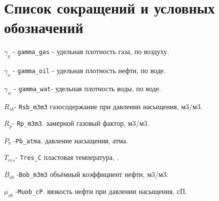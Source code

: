 \chapter*{Список сокращений и условных обозначений} %
\noindent

$\gamma_g$  - \texttt{gamma_gas} - удельная плотность газа, по воздуху. 

 $\gamma_o$  - \texttt{gamma_oil} - удельная плотность нефти, по воде.

 $\gamma_w$  - \texttt{gamma_wat}- удельная плотность воды, по воде. 

 $R_{sb}$- \texttt{Rsb_m3m3} газосодержание при давлении насыщения, м3/м3. 

$R_p$- \texttt{Rp_m3m3}. замерной газовый фактор, м3/м3.

$P_b$ -\texttt{Pb_atma}. давление насыщения, атма.  

$T_{res}$- \texttt{Tres_C} пластовая температура, \textcelsius. 

$B_{ob}$ -\texttt{Bob_m3m3} объёмный коэффициент нефти, м3/м3. 

$\mu_{ob}$ -\texttt{Muob_cP}. вязкость нефти при давлении насыщения, сП. 
